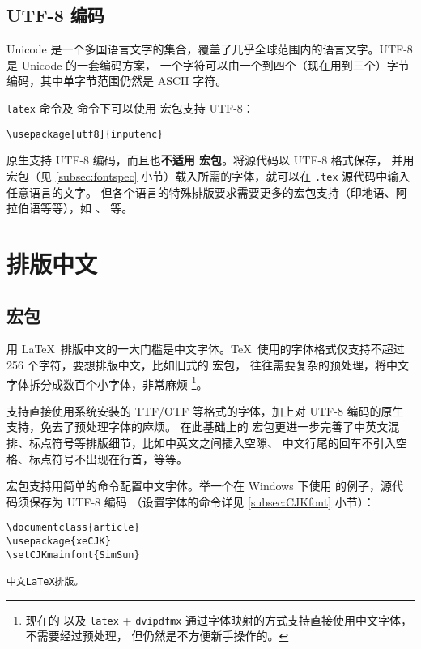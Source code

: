 \subsection{UTF-8 编码}\label{subsec:utf8}

Unicode 是一个多国语言文字的集合，覆盖了几乎全球范围内的语言文字。UTF-8 是 Unicode 的一套编码方案，
一个字符可以由一个到四个（现在用到三个）字节编码，其中单字节范围仍然是 ASCII 字符。

\texttt{latex} 命令及  命令下可以使用  宏包支持 UTF-8：
\begin{verbatim}
\usepackage[utf8]{inputenc}
\end{verbatim}

 原生支持 UTF-8 编码，而且也\textbf{不适用  宏包}。将源代码以 UTF-8 格式保存，
并用  宏包（见 \ref{subsec:fontspec} 小节）载入所需的字体，就可以在 \texttt{.tex} 源代码中输入任意语言的文字。
但各个语言的特殊排版要求需要更多的宏包支持（印地语、阿拉伯语等等），如 、  等。

\section{排版中文}

\subsection{ 宏包}

用 \LaTeX\ 排版中文的一大门槛是中文字体。\TeX\ 使用的字体格式仅支持不超过 256 个字符，要想排版中文，比如旧式的  宏包，
往往需要复杂的预处理，将中文字体拆分成数百个小字体，非常麻烦%
\footnote{现在的  以及 \texttt{latex} + \texttt{dvipdfmx} 通过字体映射的方式支持直接使用中文字体，不需要经过预处理，
但仍然是不方便新手操作的。}。

 支持直接使用系统安装的 TTF/OTF 等格式的字体，加上对 UTF-8 编码的原生支持，免去了预处理字体的麻烦。
在此基础上的  宏包更进一步完善了中英文混排、标点符号等排版细节，比如中英文之间插入空隙、
中文行尾的回车不引入空格、标点符号不出现在行首，等等。

 宏包支持用简单的命令配置中文字体。举一个在 Windows 下使用  的例子，源代码须保存为 UTF-8 编码
（设置字体的命令详见 \ref{subsec:CJKfont} 小节）：
\begin{verbatim}
\documentclass{article}
\usepackage{xeCJK}
\setCJKmainfont{SimSun}

中文LaTeX排版。

\end{verbatim}


